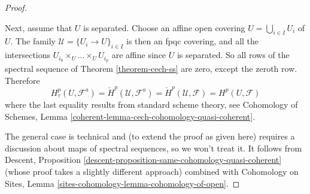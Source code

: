 \begin{proof}
\begin{enumerate}
\end{enumerate}
Next, assume that $U$ is separated. Choose an affine open covering
$U = \bigcup_{i \in I} U_i$ of $U$. The family
$\mathcal{U} = \{U_i \to U\}_{i \in I}$ is then an fpqc covering,
and all the intersections
$U_{i_0} \times_U \ldots \times_U U_{i_p}$ are affine
since $U$ is separated. So all rows of the spectral sequence of
Theorem \ref{theorem-cech-ss}
are zero, except the zeroth row. Therefore
$$
H^p_\tau(U, \mathcal{F}^a) =
\check H^p(\mathcal{U}, \mathcal{F}^a) =
\check H^p(\mathcal{U}, \mathcal{F}) = H^p(U, \mathcal{F})
$$
where the last equality results from standard scheme theory, see
Cohomology of Schemes, Lemma
\ref{coherent-lemma-cech-cohomology-quasi-coherent}.

\medskip\noindent
The general case is technical and (to extend the proof as given here)
requires a discussion about maps of spectral sequences, so we won't treat it.
It follows from
Descent, Proposition \ref{descent-proposition-same-cohomology-quasi-coherent}
(whose proof takes a slightly different approach) combined with
Cohomology on Sites, Lemma \ref{sites-cohomology-lemma-cohomology-of-open}.
\end{proof}

